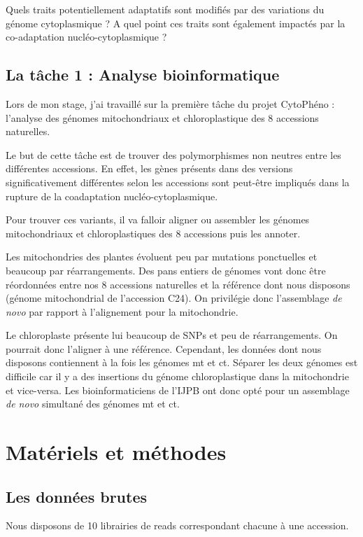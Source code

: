 \documentclass[a4paper]{article}
\begin{document}
Quels traits potentiellement adaptatifs sont modifiés par des variations du génome cytoplasmique ? A quel point ces traits sont également impactés par la co-adaptation nucléo-cytoplasmique ?  

\subsection{La tâche 1 : Analyse bioinformatique}

Lors de mon stage, j'ai travaillé sur la première tâche du projet CytoPhéno : l'analyse des génomes mitochondriaux et chloroplastique des 8 accessions naturelles.

Le but de cette tâche est de trouver des polymorphismes non neutres entre les différentes accessions. En effet, les gènes présents dans des versions significativement différentes selon les accessions sont peut-être impliqués dans la rupture de la coadaptation nucléo-cytoplasmique. 

Pour trouver ces variants, il va falloir aligner ou assembler les génomes mitochondriaux et chloroplastiques des 8 accessions puis les annoter. 

Les mitochondries des plantes évoluent peu par mutations ponctuelles et beaucoup par réarrangements. Des pans entiers de génomes vont donc être réordonnées entre nos 8 accessions naturelles et la référence dont nous disposons (génome mitochondrial de l'accession C24). On privilégie donc l'assemblage \textit{de novo} par rapport à l'alignement pour la mitochondrie.

Le chloroplaste présente lui beaucoup de SNPs et peu de réarrangements. On pourrait donc l'aligner à une référence. Cependant, les données dont nous disposons contiennent à la fois les génomes mt et ct. Séparer les deux génomes est difficile car il y a des insertions du génome chloroplastique dans la mitochondrie et vice-versa. Les bioinformaticiens de l'IJPB ont donc opté pour un assemblage \textit{de novo} simultané des génomes mt et ct.


\section{Matériels et méthodes}

\subsection{Les données brutes}

Nous disposons de 10 librairies de reads correspondant chacune à une accession. 
\end{document}
